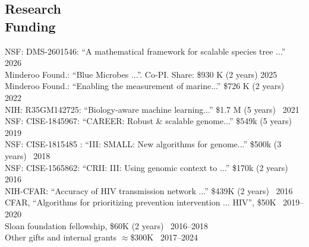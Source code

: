 \documentclass[margin,line,letterpaper]{resume}
\begin{document}
\begin{resume}
    
    
    \section{\mysidestyle Research\\Funding}
    NSF: DMS-2601546: ``A mathematical framework for scalable species tree ...'' \hfill 2026\\
    Minderoo Found.: ``Blue Microbes ...''. Co-PI. Share: \$930 K (2 years) \hfill 2025\\
     Minderoo Found.: ``Enabling the measurement of marine...''  \$726 K (2 years)~
 \hfill 2022\\
          NIH: R35GM142725:  ``Biology-aware machine learning...''
 \$1.7 M (5 years)~
  \hfill 2021\\
      NSF: CISE-1845967:  ``CAREER: Robust \& scalable genome...''
 \$549k (5 years)~
 \hfill 2019\\
      NSF: CISE-1815485 :  ``III: SMALL: New algorithms for genome...''
 \$500k (3 years)~
 \hfill 2018\\
 NSF: CISE-1565862:  ``CRII: III: Using genomic context to ...''
 \$170k (2 years)~
 \hfill 2016\\
 NIH-CFAR:  ``Accuracy of HIV transmission network ...''
 \$439K (2 years)~
 \hfill 2016\\
 CFAR, ``Algorithms for prioritizing prevention intervention ... HIV'', \$50K \hfill  ~2019--2020\\
  Sloan foundation fellowship, \$60K (2 years) \hfill  ~2016--2018\\
 Other gifts and internal grants $\approx$\$300K  \hfill  ~2017--2024







\end{resume}
\end{document}
